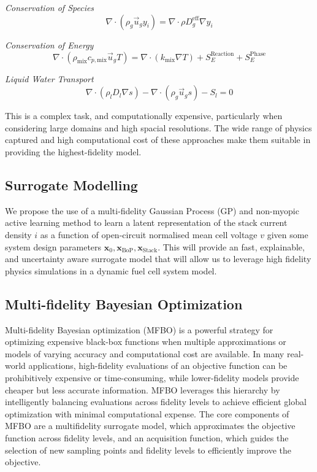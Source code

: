 \textit{Conservation of Species}
\begin{equation}
	\nabla \cdot (\rho_g \vec{u}_g y_i) = \nabla \cdot \rho D^{\text{eff}}_g \nabla y_i
\end{equation}

\textit{Conservation of Energy}
\begin{equation}
	\nabla \cdot (\rho_\text{mix} c_{p, \text{mix}} \vec{u}_g T) = \nabla \cdot (k_\text{mix} \nabla T) + S_E^{\text{Reaction}} + S_E^{\text{Phase}}
\end{equation}

\textit{Liquid Water Transport}
\begin{equation}
	\nabla \cdot (\rho_l D_l \nabla s) - \nabla \cdot (\rho_g \vec{u}_g s) - S_l = 0 \label{eq:kone_water}
\end{equation}

This is a complex task, and computationally expensive, particularly when considering large domains and high spacial resolutions.
The wide range of physics captured and high computational cost of these approaches make them suitable in providing the highest-fidelity model.

\subsection{Surrogate Modelling}
We propose the use of a multi-fidelity Gaussian Process (GP) and non-myopic active learning method to learn a latent representation of the stack current density $i$ as a function of open-circuit normalised mean cell voltage $v$ given some system design parameters $\bm{x}_0, \bm{x}_{\text{BoP}}, \bm{x}_{\text{Stack}}$. This will provide an fast, explainable, and uncertainty aware surrogate model that will allow us to leverage high fidelity physics simulations in a dynamic fuel cell system model.

\subsection{Multi-fidelity Bayesian Optimization}

Multi-fidelity Bayesian optimization (MFBO) is a powerful strategy for optimizing expensive black-box functions when multiple approximations or models of varying accuracy and computational cost are available. In many real-world applications, high-fidelity evaluations of an objective function can be prohibitively expensive or time-consuming, while lower-fidelity models provide cheaper but less accurate information. MFBO leverages this hierarchy by intelligently balancing evaluations across fidelity levels to achieve efficient global optimization with minimal computational expense. The core components of MFBO are a multifidelity surrogate model, which approximates the objective function across fidelity levels, and an acquisition function, which guides the selection of new sampling points and fidelity levels to efficiently improve the objective.

